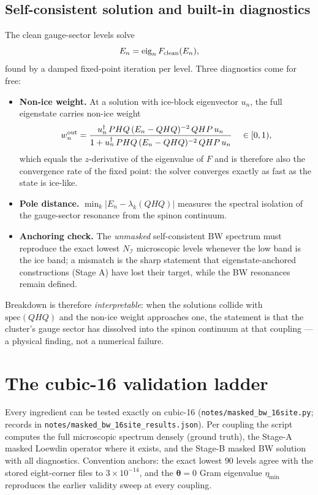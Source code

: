 \documentclass[11pt,letterpaper]{article}
\newcommand{\btheta}{\bm \theta}
\newcommand{\ice}{\mathcal I}
\theoremstyle{plain}
\theoremstyle{definition}
\begin{document}
\subsection{Self-consistent solution and built-in diagnostics}

The clean gauge-sector levels solve
\begin{equation}
E_n=\mathrm{eig}_n\,F_{\rm clean}(E_n),
\label{eq:bw_selfconsistent}
\end{equation}
found by a damped fixed-point iteration per level.  Three diagnostics come
for free:
\begin{itemize}
\item \textbf{Non-ice weight.}  At a solution with ice-block eigenvector
$u_n$, the full eigenstate carries non-ice weight
\[
w_n^{\rm out}
=\frac{u_n^\dagger\,PHQ\,(E_n-QHQ)^{-2}\,QHP\,u_n}
       {1+u_n^\dagger\,PHQ\,(E_n-QHQ)^{-2}\,QHP\,u_n}
\quad\in[0,1),
\]
which equals the $z$-derivative of the eigenvalue of $F$ and is therefore
also the convergence rate of the fixed point: the solver converges exactly
as fast as the state is ice-like.
\item \textbf{Pole distance.}  $\min_k|E_n-\lambda_k(QHQ)|$ measures the
spectral isolation of the gauge-sector resonance from the spinon continuum.
\item \textbf{Anchoring check.}  The \emph{unmasked} self-consistent BW
spectrum must reproduce the exact lowest $N_\ice$ microscopic levels
whenever the low band is the ice band; a mismatch is the sharp statement
that eigenstate-anchored constructions (Stage A) have lost their target,
while the BW resonances remain defined.
\end{itemize}
Breakdown is therefore \emph{interpretable}: when the solutions collide with
$\mathrm{spec}(QHQ)$ and the non-ice weight approaches one, the statement is
that the cluster's gauge sector has dissolved into the spinon continuum at
that coupling --- a physical finding, not a numerical failure.

\section{The cubic-16 validation ladder}
\label{sec:jpm_validity_classification_new}

Every ingredient can be tested exactly on cubic-16
(\texttt{notes/masked\_bw\_16site.py}; records in
\texttt{notes/masked\_bw\_16site\_results.json}).  Per coupling the script
computes the full microscopic spectrum densely (ground truth), the Stage-A
masked Loewdin operator where it exists, and the Stage-B masked BW solution
with all diagnostics.  Convention anchors: the exact lowest $90$ levels agree
with the stored eight-corner files to $3\times10^{-14}$, and the
$\btheta=0$ Gram eigenvalue $\eta_{\min}$ reproduces the earlier validity
sweep at every coupling.
\end{document}
